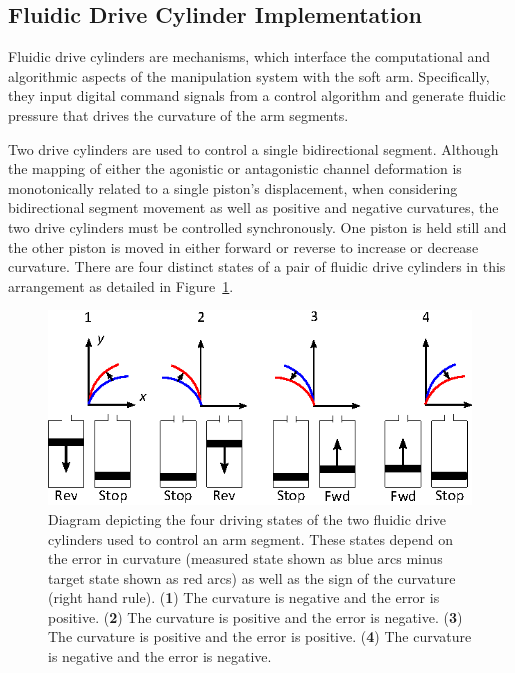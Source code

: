 \subsection{Fluidic Drive Cylinder Implementation}
\label{subsec:Power, Implementation}
Fluidic drive cylinders are mechanisms, which interface the computational and algorithmic aspects of the manipulation system with the soft arm.
Specifically, they input digital command signals from a control algorithm and generate fluidic pressure that drives the curvature of the arm segments.

Two drive cylinders are used to control a single bidirectional segment.
Although the mapping of either the agonistic or antagonistic channel deformation is monotonically related to a single piston's displacement, when considering bidirectional segment movement as well as positive and negative curvatures, the two drive cylinders must be controlled synchronously.
One piston is held still and the other piston is moved in either forward or reverse to increase or decrease curvature. There are four distinct states of a pair of fluidic drive cylinders in this arrangement as detailed in Figure~\ref{fig:DriveCylinderStates}.
\begin{figure}[thb]
\centering
   \includegraphics[width=\columnwidth]{Figures/power/DriveCylinderStates.eps}
   \caption[Diagram depicting the driving states of the fluidic drive cylinders]{Diagram depicting the four driving states of the two fluidic drive cylinders used to control an arm segment. These states depend on the error in curvature (measured state shown as blue arcs minus target state shown as red arcs) as well as the sign of the curvature (right hand rule). (\textbf{1}) The curvature is negative and the error is positive. (\textbf{2}) The curvature is positive and the error is negative. (\textbf{3}) The curvature is positive and the error is positive. (\textbf{4}) The curvature is negative and the error is negative.}
   \label{fig:DriveCylinderStates}
\end{figure} 